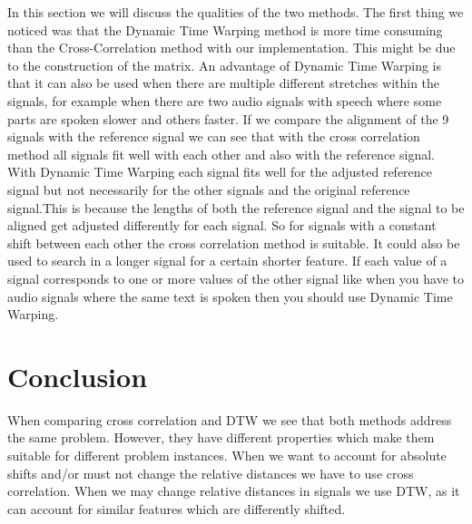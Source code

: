 \documentclass[11pt,a4paper]{article}
\begin{document}
In this section we will discuss the qualities of the two methods. The first thing we noticed was that the Dynamic Time Warping method is more time consuming than the Cross-Correlation method with our implementation. This might be due to the construction of the matrix. An advantage of Dynamic Time Warping is that it can also be used when there are multiple different stretches within the signals, for example when there are two audio signals with speech where some parts are spoken slower and others faster. If we compare the alignment of the 9 signals with the reference signal we can see that with the cross correlation method all signals fit well with each other and also with the reference signal. With Dynamic Time Warping each signal fits well for the adjusted reference signal but not necessarily for the other signals and the original reference signal.This is because the lengths of both the reference signal and the signal to be aligned get adjusted differently for each signal. So for signals with a constant shift between each other the cross correlation method is suitable. It could also be used to search in a longer signal for a certain shorter feature. If each value of a signal corresponds to one or more values of the other signal like when you have to audio signals where the same text is spoken then you should use Dynamic Time Warping.

\section{Conclusion}

When comparing cross correlation and DTW we see that both methods address the same problem. However, they have different properties which make them suitable for different problem instances.
When we want to account for absolute shifts  and/or must not change the relative distances we have to use cross correlation. When we may change relative distances in signals we use DTW, as it can account for similar features which are differently shifted. 
\end{document}
